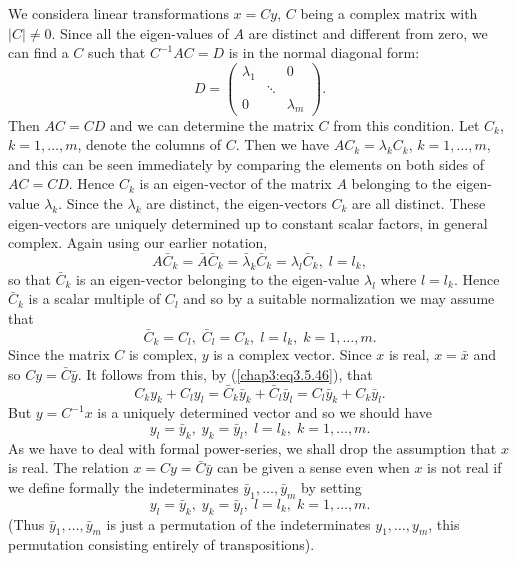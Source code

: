 We consider\pageoriginale a linear transformations $x = Cy$, $C$ being
a complex matrix with $|C| \neq 0$. Since all the eigen-values of $A$
are distinct and different from zero, we can find a $C$ such that
$C^{-1} AC = D$ is in the normal diagonal form: 
$$
D = \begin{pmatrix}
\lambda_1 & & 0\\
 & \ddots & \\
0 & & \lambda_m
\end{pmatrix}.
$$
Then $AC = CD$ and we can determine the matrix $C$ from this
condition. Let $C_k$, $k =1, \ldots, m$, denote the columns of
$C$. Then we have $AC_k = \lambda_k C_k$, $k = 1, \ldots, m$, and this
can be seen immediately by comparing the elements on both sides of $AC
= CD$. Hence $C_k$ is an eigen-vector of the matrix $A$ belonging to
the eigen-value $\lambda_k$. Since the $\lambda_k$ are distinct, the
eigen-vectors $C_k$ are all distinct. These eigen-vectors are uniquely
determined up to constant scalar factors, in general complex. Again
using our earlier notation, 
$$
A \bar{C}_k = \bar{A} \bar{C}_k = \bar{\lambda}_k \bar{C}_k =
\lambda_l \bar{C}_k, \; l = l_k,  
$$
so that $\bar{C}_k$ is an eigen-vector belonging to the eigen-value
$\lambda_l$ where $l = l_k$. Hence $\bar{C}_k$ is a scalar multiple of
$C_l$ and so by a suitable normalization we may assume that  
\begin{equation*}
\bar{C}_k = C_l, \; \bar{C}_l = C_k, \; l = l_k, \;k =1, \ldots,
m.\tag{3.5.46}\label{chap3:eq3.5.46} 
\end{equation*}
Since the matrix $C$ is complex, $y$ is a complex vector. Since $x$ is
real, $x = \bar{x}$ and so $Cy = \bar{C}\bar{y}$. It follows from
this, by (\ref{chap3:eq3.5.46}), that  
$$
C_k y_k + C_l y_l = \bar{C}_k \bar{y}_k + \bar{C}_l \bar{y}_l =
C_l\bar{y}_k + C_k \bar{y}_l.  
$$\pageoriginale
But $y = C^{-1}x$ is a uniquely determined vector and so we should
have  
$$
y_l = \bar{y}_k, \; y_k = \bar{y}_l, \; l = l_k, \; k =1, \ldots, m. 
$$
As we have to deal with formal power-series, we shall drop the
assumption that $x$ is real. The relation $x = Cy =\bar{C} \bar{y}$
can be given a sense even when $x$ is not real if we define formally
the indeterminates $\bar{y}_1, \ldots, \bar{y}_m$ by setting 
\begin{equation*}
y_l = \bar{y}_k, \; y_k = \bar{y}_l, \; l = l_k, \; k =1, \ldots,
m. \tag{3.5.47}\label{chap3:eq3.5.47} 
\end{equation*}
(Thus $\bar{y}_1,\ldots, \bar{y}_m$ is just a permutation of the
indeterminates $y_1, \ldots, y_m$, this permutation consisting
entirely of transpositions). 

